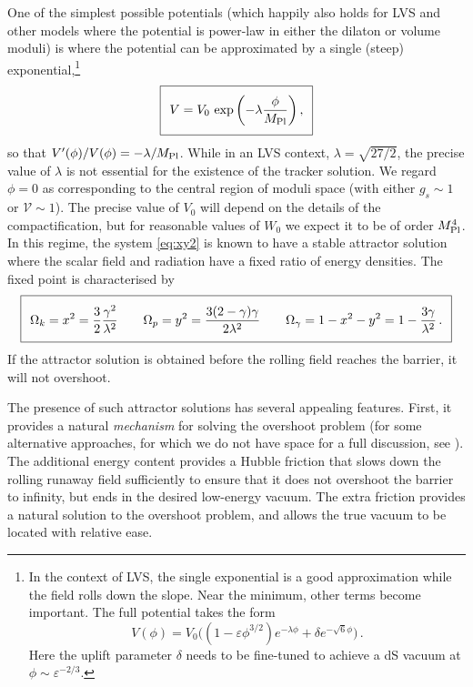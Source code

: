 One of the simplest possible potentials (which happily also holds for LVS and other models where the potential is power-law in either the dilaton or volume moduli) is where the potential can be approximated by a single (steep) exponential,\footnote{In the context of LVS, the single exponential is a good approximation while the field rolls down the slope. Near the minimum, other terms become important. The full potential takes the form
\begin{equation}
V(\phi)= V_0 \big( (1-\varepsilon \phi ^{3/2}) e^{- \lambda \phi} + \delta e^{- \sqrt{6} \phi }\big)\,. \nonumber
\end{equation}
Here the uplift parameter $\delta$ needs to be fine-tuned to achieve a dS vacuum at $\phi \sim \varepsilon^{-2/3}$. 
}
\begin{equation}
\setlength\fboxsep{0.25cm}
\setlength\fboxrule{0.4pt}
\boxed{
V = V_0\,\exp \left( - \lambda \frac{\phi}{M_{\rm Pl}} \right),
}
\end{equation}
so that $V'(\phi)/ V(\phi) = - \lambda/M_{\rm Pl}$. While in an LVS context, $\lambda = \sqrt{27/2}$, the precise value of $\lambda$ is not essential for the existence of the tracker solution. We regard $\phi = 0$ as corresponding to the central region of moduli space (with either $g_s \sim 1$ or $\mathcal{V} \sim 1$). The precise value of $V_0$ will depend on the details of the compactification, but for reasonable values of $W_0$ we expect it to be of order $M_{\rm Pl}^4$.
In this regime, the system \eqref{eq:xy2} is known to have a stable attractor solution where the scalar field and radiation have a fixed ratio of energy densities. The fixed point is characterised by
\begin{equation}
\setlength\fboxsep{0.25cm}
\setlength\fboxrule{0.4pt}
\boxed{
\Omega_k = x^2 = \frac{3}{2} \frac{\gamma^{2}}{\lambda^{2}}\quad \quad  \Omega_p = y^2 = \frac{3(2-\gamma) \gamma}{2 \lambda^{2}} \quad \quad  \Omega_{\gamma}= 1-x^2-y^2 = 1-\frac{3 \gamma}{\lambda^{2}}\,.
}
\end{equation}
If the attractor solution is obtained before the rolling field reaches the barrier, it will not overshoot.
%

The presence of such attractor solutions has several appealing features. First, it provides a natural \emph{mechanism} for solving the overshoot problem \cite{hepth9805005, hepth0001112, hepph0010102, Barreiro:2005ua, hepth0408160, hepth0505098, 07092810, Conlon:2008cj, 220700567, Alam:2022rtt} (for some alternative approaches, for which we do not have space for a full discussion, see \cite{08073216, 08104251, 10122187, 11124488}). The additional energy content provides a Hubble friction that slows down the rolling runaway field sufficiently to ensure that it does not overshoot the barrier to infinity, but ends in the desired low-energy vacuum. The extra friction provides a natural solution to the overshoot problem, and allows the true vacuum to be located with relative ease.

